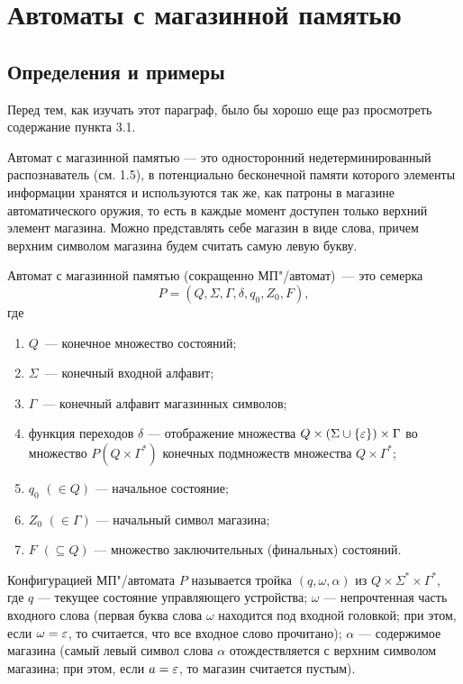 \chapter{Автоматы с магазинной памятью}
\label{Chapter8FSMSM}
\section{Определения и примеры}
\label{Chapter8Defines}
Перед тем, как изучать этот параграф, было бы хорошо еще раз просмотреть содержание пункта 3.1.

Автомат с магазинной памятью --- это односторонний недетерминированный распознаватель (см. 1.5), в потенциально бесконечной памяти которого элементы информации хранятся и используются так же, как патроны в магазине автоматического оружия, то есть в каждые момент доступен только верхний элемент магазина. Можно представлять себе магазин в виде слова, причем верхним символом магазина будем считать самую левую букву.

Автомат с магазинной памятью
(сокращенно МП"/автомат)~--- это семерка
\[P=
    (Q,\Sigma,\Gamma,\delta,q_0,Z_0,F),\]
где
\begin{enumerate}
\item $Q$~--- конечное множество состояний;

\item $\Sigma$~--- конечный входной алфавит;

\item $\Gamma$~--- конечный алфавит магазинных символов;

\item функция переходов $\delta$ ---
отображение множества $Q\times(\Sigma\cup\{\varepsilon\}) \times \Gamma$ во множество $P \left (Q \times \Gamma^* \right)$
конечных подмножеств множества $Q \times\Gamma^*$;

\item
$q_0$ $(\in Q)$ --- начальное состояние;

\item
$Z_0$ $(\in\Gamma)$ --- начальный символ
магазина;

\item
$F$ $(\subseteq Q)$ --- множество
заключительных (финальных) состояний.
\end{enumerate}


Конфигурацией МП"/автомата $P$ называется тройка $(q,\omega,\alpha)$ из $Q\times\Sigma^*\times\Gamma^*$, где $q$ --- текущее состояние управляющего устройства; $\omega$ --- непрочтенная часть входного слова (первая буква слова $\omega$ находится под входной головкой; при этом, если $\omega=\varepsilon$, то считается, что все входное слово прочитано); $\alpha$ --- содержимое магазина (самый левый символ слова $\alpha$ отождествляется с верхним символом магазина; при этом, если $a=\varepsilon$, то магазин считается пустым).

